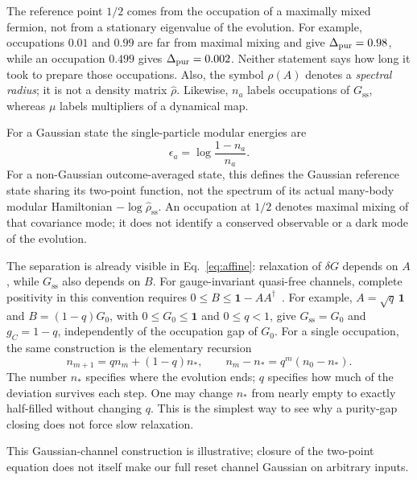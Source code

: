 \documentclass[aps,prb,onecolumn,nofootinbib,superscriptaddress,floatfix]{revtex4-2}
\newcommand{\id}{\mathbf 1}
\newcommand{\steady}{\mathrm{ss}}
\begin{document}
The reference point $1/2$ comes from the occupation of a maximally
mixed fermion, not from a stationary eigenvalue of the evolution.
For example, occupations $0.01$ and $0.99$ are far from maximal
mixing and give $\Delta_{\rm pur}=0.98$, while an occupation
$0.499$ gives $\Delta_{\rm pur}=0.002$. Neither statement says how
long it took to prepare those occupations. Also, the symbol
$\rho(A)$ denotes a \emph{spectral radius}; it is not a density
matrix $\hat\rho$. Likewise, $n_a$ labels occupations of $G_\steady$,
whereas $\mu$ labels multipliers of a dynamical map.

For a Gaussian state the single-particle modular energies are
\begin{equation}
 \epsilon_a=\log\frac{1-n_a}{n_a}. \label{eq:modular}
\end{equation}
For a non-Gaussian outcome-averaged state, this defines the Gaussian
reference state sharing its two-point function, not the spectrum of
its actual many-body modular Hamiltonian $-\log\hat\rho_\steady$.
An occupation at $1/2$ denotes maximal mixing of that covariance
mode; it does not identify a conserved observable or a dark mode
of the evolution.

The separation is already visible in Eq.~\eqref{eq:affine}:
relaxation of $\delta G$ depends on $A$, while $G_\steady$ also depends
on $B$. For gauge-invariant quasi-free channels, complete positivity
in this convention requires $0\le B\le\id-AA^\dagger$~\cite{DFP}.
For example, $A=\sqrt q\,\id$ and $B=(1-q)G_0$, with
$0\le G_0\le\id$ and $0\le q<1$, give $G_\steady=G_0$ and
$g_C=1-q$, independently of the occupation gap of $G_0$.
For a single occupation, the same construction is the elementary
recursion
\begin{equation}
 n_{m+1}=q n_m+(1-q)n_*,
 \qquad n_m-n_*=q^m(n_0-n_*).
 \label{eq:scalar_source}
\end{equation}
The number $n_*$ specifies where the evolution ends; $q$ specifies
how much of the deviation survives each step. One may change
$n_*$ from nearly empty to exactly half-filled without changing
$q$. This is the simplest way to see why a purity-gap closing does
not force slow relaxation.

This Gaussian-channel construction is illustrative; closure of the
two-point equation does not itself make our full reset channel
Gaussian on arbitrary inputs.
\end{document}
